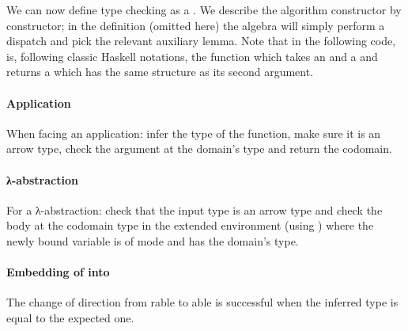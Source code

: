 \noindent
\begin{minipage}{\textwidth}
\begin{minipage}[t]{0.53\textwidth}
\end{minipage}
\begin{minipage}[t]{0.46\textwidth}
\end{minipage}
\end{minipage}

We can now define type checking as a \semrec{}. We describe the algorithm constructor
by constructor; in the  definition (omitted here) the algebra will
simply perform a dispatch and pick the relevant auxiliary lemma. Note that in the
following code, \AF{\_<\$\_} is, following classic Haskell notations, the function
which takes an  and a { } and returns a { }
which has the same structure as its second argument.

\paragraph*{Application} When facing an application: infer the type of the function,
make sure it is an arrow type, check the argument at the domain's type and return
the codomain.
\begin{agdasnippet}
\end{agdasnippet}
%
\paragraph*{λ-abstraction} For a λ-abstraction: check that the input
type  is an arrow type and check the body  at the
codomain type in the extended environment (using ) where the
newly bound variable is of mode  and has the domain's type.
\begin{agdasnippet}
\end{agdasnippet}
%
\paragraph*{Embedding of  into } The change of
direction from rable to able is successful when the
inferred type is equal to the expected one.
\begin{agdasnippet}
\end{agdasnippet}
%
